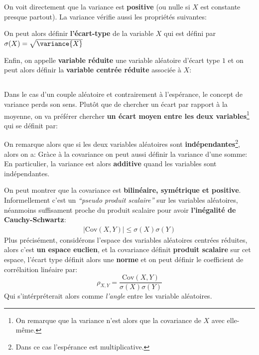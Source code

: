 On voit directement que la variance est \textbf{positive} (ou nulle si \(X\) est constante presque partout). \+
La variance vérifie aussi les propriétés suivantes:

On peut alors définir \textbf{l'écart-type} de la variable \(X\) qui est défini par \(\sigma(X) = \sqrt{\variance{X}}\)\<

Enfin, on appelle \textbf{variable réduite} une variable aléatoire d'écart type \(1\) et on peut alors définir la \textbf{variable centrée réduite} associée à \(X\):


\subsection*{}
Dans le cas d'un couple aléatoire et contrairement à l'espérance, le concept de variance perds son sens. Plutôt que de chercher un écart par rapport à la moyenne, on va préférer chercher \textbf{un écart moyen entre les deux variables}\footnote[1]{On remarque que la variance n'est alors que la covariance de \(X\) avec elle-même.} qui se définit par:

On remarque alors que si les deux variables aléatoires sont \textbf{indépendantes}\footnote[2]{Dans ce cas l'espérance est multiplicative.}, alors on a:
Gràce à la covariance on peut aussi définir la variance d'une somme:
En particulier, la variance est alors \textbf{additive} quand les variables sont indépendantes.\<

On peut montrer que la covariance est \textbf{bilinéaire, symétrique et positive}. Informellement c'est un \textit{``pseudo produit scalaire''} sur les variables aléatoires, néanmoins suffisament proche du produit scalaire pour avoir \textbf{l'inégalité de Cauchy-Schwartz}:
\begin{align*}
   |\text{Cov}(X, Y)| \leq \sigma(X)\sigma(Y)
\end{align*}
Plus précisément, considérons l'espace des variables aléatoires centrées réduites, alors c'est \textbf{un espace euclien}, et la covariance définit \textbf{produit scalaire} sur cet espace, l'écart type définit alors une \textbf{norme} et on peut définir le coefficient de corrélaition linéaire par:
\[
   \rho_{X, Y} = \frac{\text{Cov}(X, Y)}{\sigma(X)\sigma(Y)}
\]
Qui s'intérpréterait alors comme \textit{l'angle} entre les variable aléatoires.
\pagebreak

